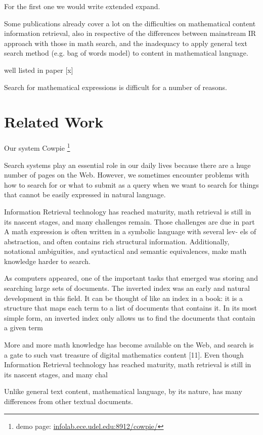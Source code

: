 For the first one we would write extended expand.


Some publications already cover a lot on the difficulties on mathematical content information retrieval, also in respective of the differences between mainstream IR approach with those in math search, and the inadequacy to apply general text search method (e.g. bag of words model) to content in mathematical language.

well listed in paper [x]

Search for mathematical expressions is difficult for a number of reasons.

\section{Related Work}

Our system Cowpie \footnote{demo page: \url{infolab.ece.udel.edu:8912/cowpie/}} \cite{WolframAlpha}

Search systems play an essential role in our daily lives because there are
a huge number of pages on the Web. However, we sometimes encounter
problems with how to search for or what to submit as a query when we
want to search for things that cannot be easily expressed in natural language.

Information Retrieval technology has reached maturity, math retrieval is still in
its nascent stages, and many challenges remain. Those challenges are due in part
A math expression is often written in a symbolic language with several lev-
els of abstraction, and often contains rich structural information. Additionally,
notational ambiguities, and syntactical and semantic equivalences, make math
knowledge harder to search.


As computers appeared, one of the important tasks that emerged was
storing and searching large sets of documents. The inverted index was an
early and natural development in this field. It can be thought of like an index
in a book: it is a structure that maps each term to a list of documents that
contains it. In its most simple form, an inverted index only allows us to find
the documents that contain a given term

More and more math knowledge has become available on the Web, and search
is a gate to such vast treasure of digital mathematics content [11]. Even though
Information Retrieval technology has reached maturity, math retrieval is still in
its nascent stages, and many chal

Unlike general text content, mathematical language, by its nature, has many differences from other textual documents. 

